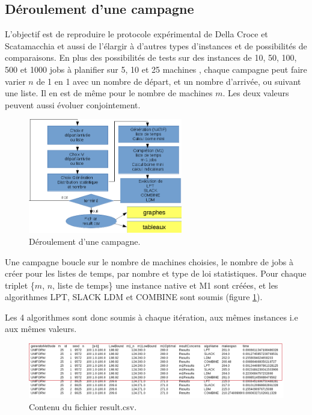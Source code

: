 \documentclass[a4paper,12pt]{report}
\theoremstyle{plain}				%
\theoremstyle{definition}				%
\newcommand\dcs{Della Croce et Scatamacchia\xspace}
\begin{document}
\subsection{Déroulement d'une campagne} \label{ssec:campagnesDeroullementDUneCampagne}
L'objectif est de reproduire le protocole expérimental de \dcs et aussi de l'élargir 
  à d'autres types d'instances et de possibilités de comparaisons.
En plus des possibilités de tests sur des instances de 10, 50, 100, 500 et 1000 jobs à planifier 
  sur 5, 10 et 25 machines \cite{della2020longest}, 
  chaque campagne peut faire varier $n$ de 1 en 1 avec 
  un nombre de départ, et un nombre d'arrivée, 
  ou suivant une liste. 
Il en est de même pour le nombre de machines $m$. 
Les deux valeurs peuvent aussi évoluer conjointement.

\begin{figure}
{\centering
\includegraphics[height=50mm]{derouleCampagne.png}
\caption{Déroulement d'une campagne.}
\label{fig:deroulementDUneCampagne}
\par}
\end{figure}

Une campagne boucle sur le nombre de machines choisies, le nombre de jobs à créer pour les listes de temps, par nombre et type de loi statistiques. Pour chaque triplet \{$m$, $n$, liste de temps\} une instance native et M1 sont créées, et les algorithmes LPT, SLACK LDM et COMBINE sont soumis (figure \ref{fig:deroulementDUneCampagne}).

Les 4 algorithmes sont donc soumis à chaque itération, aux mêmes instances i.e aux mêmes valeurs. 

\begin{figure}
{\centering
\includegraphics[width=\columnwidth]{contenuResultCSV.png}
\caption{Contenu du fichier result.csv.}
\label{fig:contenuResultCSV}
\par}
\end{figure}
\end{document}
